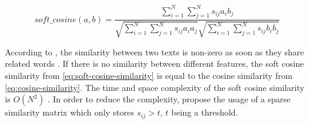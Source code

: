 \begin{equation}
    soft\_cosine(a,b) = \frac{\sum_{i=1}^{N}\sum_{j=1}^{N}s_{ij}a_{i}b_{j}}{\sqrt{\sum_{i=1}^{N}\sum_{j=1}^{N}s_{ij}a_{i}a_{j}}\sqrt{\sum_{i=1}^{N}\sum_{j=1}^{N}s_{ij}b_{i}b_{j}}}
    \label{eq:soft-cosine-similarity}
\end{equation}

According to \citeauthor{soft_cosine2017}, the similarity between two texts is non-zero as soon as they share related words \cite{soft_cosine2017}.
If there is no similarity between different features, 
the soft cosine similarity from \autoref{eq:soft-cosine-similarity} is equal to the cosine similarity from \autoref{eq:cosine-similarity}.
The time and space complexity of the soft cosine similarity is $O(N^2)$ \cite{soft_cosine2014}.
In order to reduce the complexity, \citeauthor{soft_cosine2014} propose the usage of a sparse similarity matrix which only stores $s_{ij} > t$, 
$t$ being a threshold.
